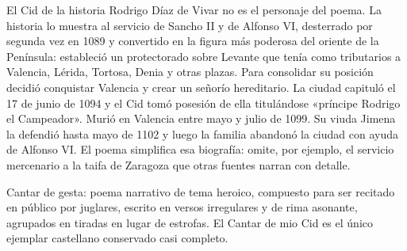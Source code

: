 \documentclass{book}
\begin{document}
\begin{tcolorbox}[title={Definición}, studiumdef, breakable]

El Cid de la historia
Rodrigo Díaz de Vivar no es el personaje del poema. La historia lo muestra al servicio de Sancho II y de Alfonso VI, desterrado por segunda vez en 1089 y convertido en la figura más poderosa del oriente de la Península: estableció un protectorado sobre Levante que tenía como tributarios a Valencia, Lérida, Tortosa, Denia y otras plazas. Para consolidar su posición decidió conquistar Valencia y crear un señorío hereditario. La ciudad capituló el 17 de junio de 1094 y el Cid tomó posesión de ella titulándose «príncipe Rodrigo el Campeador». Murió en Valencia entre mayo y julio de 1099. Su viuda Jimena la defendió hasta mayo de 1102 y luego la familia abandonó la ciudad con ayuda de Alfonso VI. El poema simplifica esa biografía: omite, por ejemplo, el servicio mercenario a la taifa de Zaragoza que otras fuentes narran con detalle.

\end{tcolorbox}

\begin{tcolorbox}[title={Definición}, studiumdef, breakable]

Cantar de gesta: poema narrativo de tema heroico, compuesto para ser recitado en público por juglares, escrito en versos irregulares y de rima asonante, agrupados en tiradas en lugar de estrofas. El Cantar de mio Cid es el único ejemplar castellano conservado casi completo.

\end{tcolorbox}
\end{document}
